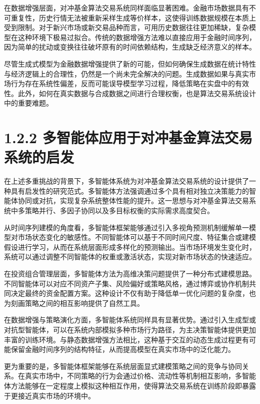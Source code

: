 \documentclass[UTF8]{ctexart}
\begin{document}
在数据增强层面，对冲基金算法交易系统同样面临显著困难。金融市场数据具有不可重复性，历史行情无法被重新采样生成等价样本，这使得训练数据规模在本质上受到限制。对于新兴市场或新交易品种而言，可用历史数据往往更加稀缺，复杂模型在这种环境下极易过拟合。传统的数据增强方法难以直接应用于金融时间序列，因为简单的扰动或变换往往破坏原有的时间依赖结构，生成缺乏经济意义的样本。

尽管生成式模型为金融数据增强提供了新的可能，但如何确保生成数据在统计特性与经济逻辑上的合理性，仍然是一个尚未完全解决的问题。生成数据如果与真实市场行为存在系统性偏差，反而可能误导模型学习过程，降低策略在实盘中的有效性。此外，如何在真实数据与合成数据之间进行合理权衡，也是算法交易系统设计中的重要难题。

\section{1.2.2
多智能体应用于对冲基金算法交易系统的启发}\label{ux591aux667aux80fdux4f53ux5e94ux7528ux4e8eux5bf9ux51b2ux57faux91d1ux7b97ux6cd5ux4ea4ux6613ux7cfbux7edfux7684ux542fux53d1}

在上述多重挑战的背景下，多智能体系统为对冲基金算法交易系统的设计提供了一种具有启发性的研究范式。多智能体方法强调通过多个具有相对独立决策能力的智能体协同或对抗，实现复杂系统整体性能的提升。这一思想与对冲基金算法交易系统中多策略并行、多因子协同以及多目标权衡的实际需求高度契合。

从时间序列建模的角度看，多智能体框架能够通过引入多视角预测机制缓解单一模型对市场状态变化的敏感性。不同智能体可以基于不同时间尺度、特征集合或建模假设进行学习，从而在系统层面形成多样化的预测输出。当市场环境发生变化时，系统可以通过调整不同智能体的权重或激活状态，实现对新市场状态的快速适应。

在投资组合管理层面，多智能体方法为高维决策问题提供了一种分布式建模思路。不同智能体可以对应不同资产子集、风险偏好或策略风格，通过博弈或协作机制共同决定最终的资金配置方案。这种设计不仅有助于降低单一优化问题的复杂度，也为刻画策略之间的相互影响提供了自然工具。

在数据增强与策略演化方面，多智能体系统同样具有显著优势。通过引入生成型或对抗型智能体，可以在系统内部模拟多种市场行为路径，为主决策智能体提供更加丰富的训练环境。与静态数据增强方法相比，这种基于交互的动态生成过程更有可能保留金融时间序列的结构特征，从而提高模型在真实市场中的泛化能力。

更为重要的是，多智能体框架能够在系统层面显式建模策略之间的竞争与协同关系。在真实市场中，不同策略的行为会通过价格、流动性等机制相互影响，多智能体方法能够在一定程度上模拟这种相互作用，使得算法交易系统在训练阶段即暴露于更接近真实市场的环境中。
\end{document}
